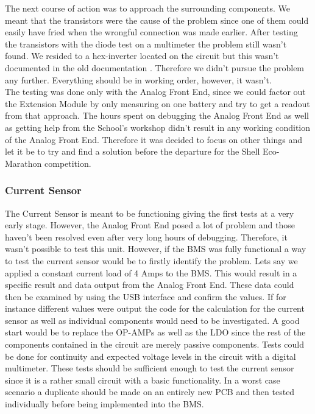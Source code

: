 The next course of action was to approach the surrounding components. We meant that the transistors were the cause of the problem since one of them could easily have fried when the wrongful connection was made earlier. After testing the transistors with the diode test on a multimeter the problem still wasn't found. We resided to a hex-inverter located on the circuit but this wasn't documented in the old documentation . Therefore we didn't pursue the problem any further. Everything should be in working order, however, it wasn't.\\
The testing was done only with the Analog Front End, since we could factor out the Extension Module by only measuring on one battery and try to get a readout from that approach. The hours spent on debugging the Analog Front End as well as getting help from the School's workshop didn't result in any working condition of the Analog Front End. Therefore it was decided to focus on other things and let it be to try and find a solution before the departure for the Shell Eco-Marathon competition. \\


\subsubsection{Current Sensor}
The Current Sensor is meant to be functioning giving the first tests at a very early stage. However, the Analog Front End posed a lot of problem and those haven't been resolved even after very long hours of debugging. Therefore, it wasn't possible to test this unit. However, if the BMS was fully functional a way to test the current sensor would be to firstly identify the problem. Lets say we applied a constant current load of 4 Amps to the BMS. This would result in a specific result and data output from the Analog Front End. These data could then be examined by using the USB interface and confirm the values. If for instance different values were output the code for the calculation for the current sensor as well as individual components would need to be investigated. A good start would be to replace the OP-AMPs as well as the LDO since the rest of the components contained in the circuit  are merely passive components. Tests could be done for continuity and expected voltage levels in the circuit with a digital multimeter. These tests should be sufficient enough to test the current sensor since it is a rather small circuit with a basic functionality. In a worst case scenario a duplicate should be made on an entirely new PCB and then tested individually before being implemented into the BMS.    

